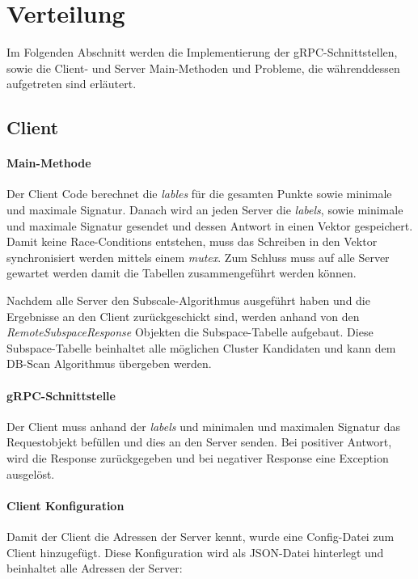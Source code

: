 \section{Verteilung}
\label{sec:verteilung}
Im Folgenden Abschnitt werden die Implementierung der gRPC-Schnittstellen, sowie die Client- und Server Main-Methoden
und Probleme, die währenddessen aufgetreten sind erläutert.

\subsection{Client}
\label{sec:client}

\paragraph{Main-Methode}
Der Client Code berechnet die \textit{lables} für die gesamten Punkte sowie minimale und maximale Signatur. Danach wird
an jeden Server die \textit{labels}, sowie minimale und maximale Signatur gesendet und dessen Antwort in einen Vektor
gespeichert. Damit keine Race-Conditions entstehen, muss das Schreiben in den Vektor synchronisiert werden mittels einem
\textit{mutex}. Zum Schluss muss auf alle Server gewartet werden damit die Tabellen zusammengeführt werden können.

Nachdem alle Server den Subscale-Algorithmus ausgeführt haben und die Ergebnisse an den Client zurückgeschickt sind,
werden anhand von den \textit{RemoteSubspaceResponse} Objekten die Subspace-Tabelle aufgebaut. Diese Subspace-Tabelle
beinhaltet alle möglichen Cluster Kandidaten und kann dem DB-Scan Algorithmus übergeben werden.

\paragraph{gRPC-Schnittstelle} Der Client muss anhand der \textit{labels} und minimalen und maximalen Signatur das
Requestobjekt befüllen und dies an den Server senden. Bei positiver Antwort, wird die Response zurückgegeben und bei
negativer Response eine Exception ausgelöst.


\paragraph{Client Konfiguration}
Damit der Client die Adressen der Server kennt, wurde eine Config-Datei zum Client hinzugefügt. Diese Konfiguration wird
als JSON-Datei hinterlegt und beinhaltet alle Adressen der Server:



